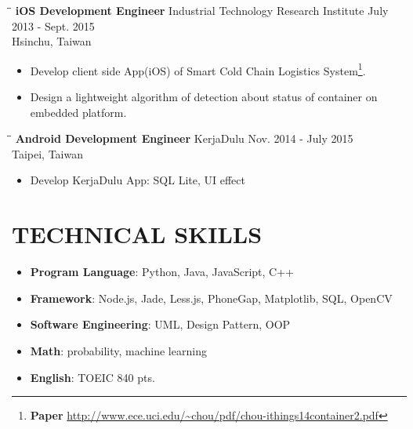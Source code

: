 \documentclass{res}
\begin{document}
\begin{resume}
\begin{itemize}
				\end{itemize}
				\begin{tabbing}
	 				\hspace{2.3in}\= \hspace{2.6in}\= \kill %
					{\bf iOS Development Engineer} \>Industrial Technology Research Institute	
					\>July 2013 - Sept. 2015\\
													\>Hsinchu, Taiwan
	 			\end{tabbing}\vspace{-20pt}
	 			\vspace{0.2in}	
				\begin{itemize}
					\item Develop client side App(iOS) of Smart Cold Chain Logistics System\footnote{​{\bf Paper}  \url{http://www.ece.uci.edu/~chou/pdf/chou-ithings14container2.pdf}}.
					\vspace{-0.05in}	
					\item Design a lightweight algorithm of detection about status of container on embedded platform.
				\end{itemize}
				\begin{tabbing}%
					\hspace{2.3in}\= \hspace{2.6in}\= \kill %
	 				{\bf Android Development Engineer }  \>KerjaDulu\> Nov. 2014 - July 2015\\
													\>Taipei, Taiwan
				\end{tabbing}\vspace{-20pt}
				\vspace{0.2in}	
				\begin{itemize}
					\item Develop KerjaDulu App: SQL Lite, UI effect
				\end{itemize}

			
			\section{TECHNICAL SKILLS}          
				\begin{itemize}
					\item {\bf Program Language}: Python, Java, JavaScript, C++
					\vspace{-0.05in}
					\item {\bf Framework}: Node.js, Jade, Less.js, PhoneGap, Matplotlib, SQL, OpenCV
					\vspace{-0.05in}
					\item {\bf Software Engineering}: UML, Design Pattern, OOP
					\vspace{-0.05in}
					\item {\bf Math}: probability, machine learning	
					\vspace{-0.05in}
					\item {\bf English}: TOEIC 840 pts.
				\end{itemize}


\end{resume}
\end{document}
